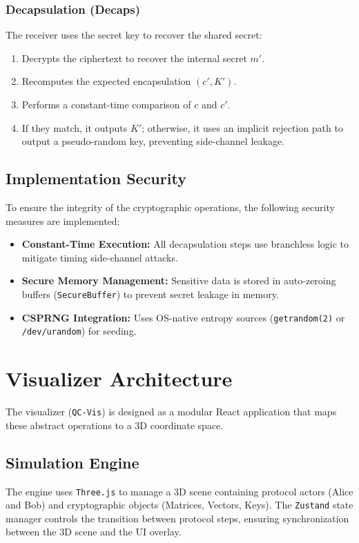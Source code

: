 \documentclass[12pt,a4paper]{article}
\begin{document}
\subsubsection{Decapsulation (Decaps)}
The receiver uses the secret key to recover the shared secret:
\begin{enumerate}
    \item Decrypts the ciphertext to recover the internal secret $m'$.
    \item Recomputes the expected encapsulation $(c', K')$.
    \item Performs a constant-time comparison of $c$ and $c'$.
    \item If they match, it outputs $K'$; otherwise, it uses an implicit rejection path to output a pseudo-random key, preventing side-channel leakage.
\end{enumerate}

\subsection{Implementation Security}
To ensure the integrity of the cryptographic operations, the following security measures are implemented:
\begin{itemize}
    \item \textbf{Constant-Time Execution:} All decapsulation steps use branchless logic to mitigate timing side-channel attacks.
    \item \textbf{Secure Memory Management:} Sensitive data is stored in auto-zeroing buffers (\texttt{SecureBuffer}) to prevent secret leakage in memory.
    \item \textbf{CSPRNG Integration:} Uses OS-native entropy sources (\texttt{getrandom(2)} or \texttt{/dev/urandom}) for seeding.
\end{itemize}

\section{Visualizer Architecture}
The visualizer (\texttt{QC-Vis}) is designed as a modular React application that maps these abstract operations to a 3D coordinate space.

\subsection{Simulation Engine}
The engine uses \texttt{Three.js} to manage a 3D scene containing protocol actors (Alice and Bob) and cryptographic objects (Matrices, Vectors, Keys). The \texttt{Zustand} state manager controls the transition between protocol steps, ensuring synchronization between the 3D scene and the UI overlay.
\end{document}

